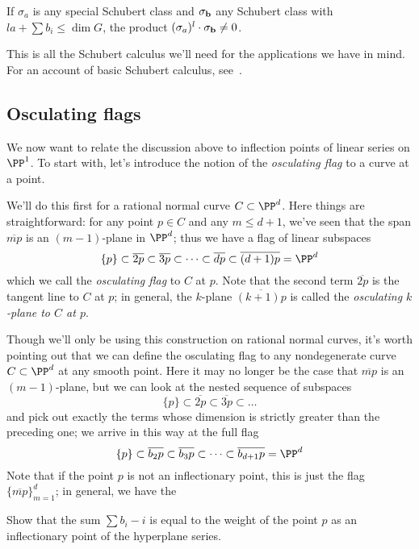 \begin{corollary}
If $\sigma_a$ is any special Schubert class  and $\sigma_{\bf b}$ any Schubert class with $l a + \sum b_i \leq \dim G$, the product  $(\sigma_a)^l \cdot \sigma_{\bf b} \neq 0$.
\end{corollary}

This is all the Schubert calculus we'll need for the applications we have in mind. For an account of basic Schubert calculus, see~\cite{3264}.

\subsection{Osculating flags}

We now want to relate the discussion above to inflection points of linear series on $\PP^1$.  To start with, let's introduce the notion of the \emph{osculating flag} to a curve at a point.

We'll do this first for a rational normal curve $C \subset \PP^d$. Here things are straightforward: for any point $p \in C$ and any $m \leq d+1$, we've seen that the span $\overline{mp}$ is an $(m-1)$-plane in $\PP^d$; thus we have a flag of linear subspaces
$$
\{p\} \subset \overline{2p} \subset \overline{3p} \subset \dots \subset \overline{dp} \subset \overline{(d+1)p} = \PP^d
$$
which we call the \emph{osculating flag} to $C$ at $p$. Note that the second term $\overline{2p}$ is the tangent line to $C$ at $p$; in general, the $k$-plane $\overline{(k+1)p}$ is called the \emph{osculating $k$-plane to $C$ at $p$}.

Though we'll only be using this construction on rational normal curves, it's worth pointing out that we can define the osculating flag to any nondegenerate curve $C \subset \PP^d$ at any smooth point. Here it may no longer be the case that $\overline{mp}$ is an $(m-1)$-plane, but we can look at the nested sequence of subspaces
$$
\{p\} \subset \overline{2p} \subset \overline{3p} \subset \dots 
$$
and pick out exactly the terms whose dimension is strictly greater than the preceding one; we arrive in this way at the full flag
$$
\{p\} \subset \overline{b_2p} \subset \overline{b_3p} \subset \dots \subset \overline{b_{d+1}p} = \PP^d
$$
Note that if the point $p$ is not an inflectionary point, this is just the flag $\{\overline{mp}\}_{m=1}^d$; in general, we have the 

\begin{exercise}
Show that the sum $\sum b_i - i$ is equal to the weight of the point $p$ as an inflectionary point of the hyperplane series.
\end{exercise}

